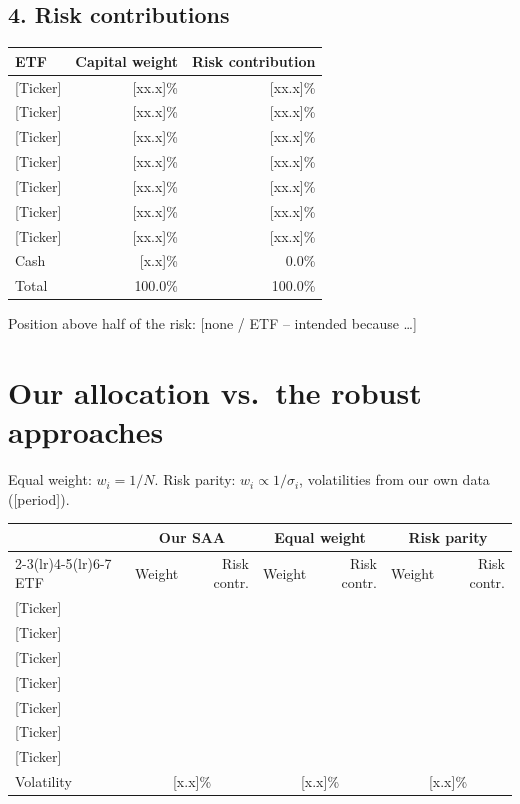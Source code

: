 \documentclass[11pt,a4paper]{article}
\newcommand{\todo}[1]{\textcolor{BrickRed}{[#1]}}
\begin{document}
\subsection*{4. Risk contributions}
\begin{center}
\begin{tabular}{@{}lrr@{}}
\toprule
ETF & Capital weight & Risk contribution \\
\midrule
\todo{Ticker} & \todo{xx.x}\% & \todo{xx.x}\% \\
\todo{Ticker} & \todo{xx.x}\% & \todo{xx.x}\% \\
\todo{Ticker} & \todo{xx.x}\% & \todo{xx.x}\% \\
\todo{Ticker} & \todo{xx.x}\% & \todo{xx.x}\% \\
\todo{Ticker} & \todo{xx.x}\% & \todo{xx.x}\% \\
\todo{Ticker} & \todo{xx.x}\% & \todo{xx.x}\% \\
\todo{Ticker} & \todo{xx.x}\% & \todo{xx.x}\% \\
Cash          & \todo{x.x}\%  & 0.0\%         \\
\midrule
Total & 100.0\% & 100.0\% \\
\bottomrule
\end{tabular}
\end{center}
Position above half of the risk: \todo{none / ETF -- intended because \ldots}

\newpage
\section*{Our allocation vs.\ the robust approaches}

Equal weight: $w_i = 1/N$. Risk parity: $w_i \propto 1/\sigma_i$, volatilities from our own data (\todo{period}).

\begin{center}
\small
\begin{tabular}{@{}lrrrrrr@{}}
\toprule
 & \multicolumn{2}{c}{Our SAA} & \multicolumn{2}{c}{Equal weight} & \multicolumn{2}{c}{Risk parity} \\
\cmidrule(lr){2-3}\cmidrule(lr){4-5}\cmidrule(lr){6-7}
ETF & Weight & Risk contr. & Weight & Risk contr. & Weight & Risk contr. \\
\midrule
\todo{Ticker} & & & & & & \\
\todo{Ticker} & & & & & & \\
\todo{Ticker} & & & & & & \\
\todo{Ticker} & & & & & & \\
\todo{Ticker} & & & & & & \\
\todo{Ticker} & & & & & & \\
\todo{Ticker} & & & & & & \\
\midrule
Volatility & \multicolumn{2}{c}{\todo{x.x}\%} & \multicolumn{2}{c}{\todo{x.x}\%} & \multicolumn{2}{c}{\todo{x.x}\%} \\
\bottomrule
\end{tabular}
\end{center}
\end{document}
